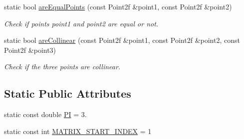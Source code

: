 \begin{DoxyCompactItemize}
static bool \hyperlink{classmultiscale_1_1Geometry2D_aa2d3ac595072b9ab61879a44629d7969}{are\-Equal\-Points} (const Point2f \&point1, const Point2f \&point2)
\begin{DoxyCompactList}\small\item\em Check if points point1 and point2 are equal or not. \end{DoxyCompactList}\item 
static bool \hyperlink{classmultiscale_1_1Geometry2D_aa8b75808a35a471becae0ad99e708bdd}{are\-Collinear} (const Point2f \&point1, const Point2f \&point2, const Point2f \&point3)
\begin{DoxyCompactList}\small\item\em Check if the three points are collinear. \end{DoxyCompactList}\end{DoxyCompactItemize}
\subsection*{Static Public Attributes}
\begin{DoxyCompactItemize}
\item 
static const double \hyperlink{classmultiscale_1_1Geometry2D_a7039b8bbe89283e22744c0631d597660}{P\-I} = 3.
\item 
static const int \hyperlink{classmultiscale_1_1Geometry2D_ade1d55d3ef110b73d42a3e4c4360ba17}{M\-A\-T\-R\-I\-X\-\_\-\-S\-T\-A\-R\-T\-\_\-\-I\-N\-D\-E\-X} = 1
\end{DoxyCompactItemize}

